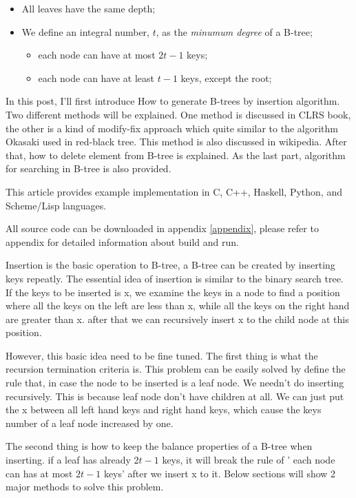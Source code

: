 \documentclass{article}
\begin{document}
\begin{itemize}
\item All leaves have the same depth;
\item We define an integral number, $t$, as the {\em minumum degree} of a 
B-tree;
    \begin{itemize}
        \item each node can have at most $2t-1$ keys;
        \item each node can have at least $t-1$ keys, except the root;
    \end{itemize}
\end{itemize}

In this post, I'll first introduce How to generate B-trees by insertion
algorithm. Two different methods will be explained. One method is discussed in CLRS
book, the other is a kind of modify-fix approach which quite similar to the
algorithm Okasaki used in red-black tree\cite{okasaki-rbtree}. This method
is also discussed in wikipedia\cite{wiki-b-tree}. After that, how to delete
element from B-tree is explained. As the last part, algorithm for searching 
in B-tree is also provided.

This article provides example implementation in C, C++, Haskell, Python, and 
Scheme/Lisp languages. 

All source code can be downloaded in appendix \ref{appendix}, please 
refer to appendix for detailed information about build and run.

Insertion is the basic operation to B-tree, a B-tree can be created by inserting
keys repeatly. The essential idea of insertion is similar to the binary
search tree. If the keys to be inserted is x, we examine the keys in a 
node to find a position where all the keys on the left are less than x,
while all the keys on the right hand are greater than x. after that
we can recursively insert x to the child node at this position.

However, this basic idea need to be fine tuned. The first thing is what
the recursion termination criteria is. This problem can be easily solved
by define the rule that, in case the node to be inserted is a leaf node.
We needn't do inserting recursively. This is because leaf node don't have
children at all. We can just put the x between all left hand keys and 
right hand keys, which cause the keys number of a leaf node increased by one.

The second thing is how to keep the balance properties of a B-tree when
inserting. if a leaf has already $2t-1$ keys, it will break the rule of '
each node can has at most $2t-1$ keys' after we insert x to it. Below
sections will show 2 major methods to solve this problem. 
\end{document}

